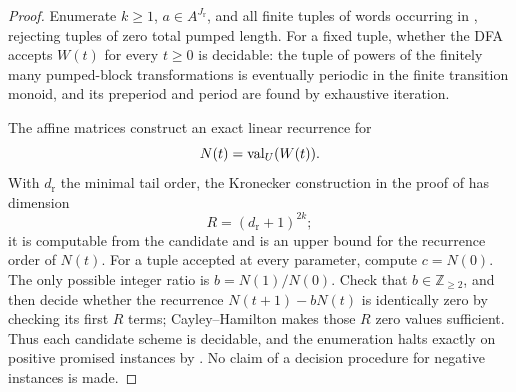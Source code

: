 \begin{proof}
  Enumerate \(k\ge1\), \(a\in A^{J_{\mathrm r}}\), and all finite tuples
  of words occurring in
  , rejecting tuples of zero
  total pumped length. For a fixed tuple, whether the DFA accepts
  \(W(t)\) for every \(t\ge0\) is decidable: the tuple of powers of the
  finitely many pumped-block transformations is eventually periodic in
  the finite transition monoid, and its preperiod and period are found
  by exhaustive iteration.

  The affine matrices construct an exact linear recurrence for
  \[
    N(t)=\operatorname{val}_U(W(t)).
  \]
  With \(d_{\mathrm r}\) the minimal tail order, the Kronecker construction
  in the proof of
   has dimension
  \[
    R=(d_{\mathrm r}+1)^{2k};
  \]
  it is computable from the candidate and is an upper bound for the
  recurrence order of \(N(t)\). For a tuple accepted at every parameter,
  compute \(c=N(0)\). The only
  possible integer ratio is \(b=N(1)/N(0)\). Check that
  \(b\in\mathbb Z_{\ge2}\), and then decide whether the recurrence
  \(N(t+1)-bN(t)\) is identically zero by checking its first \(R\) terms;
  Cayley--Hamilton makes those \(R\) zero values sufficient. Thus each
  candidate scheme is decidable, and the enumeration halts exactly on
  positive promised instances by
  . No claim of a
  decision procedure for negative instances is made.
\end{proof}

